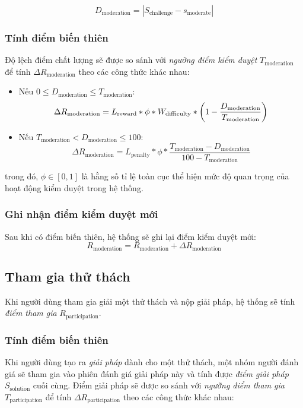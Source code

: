 \[D_{\text{moderation}}=|S_{\text{challenge}}-s_{\text{moderate}}|\]

\subsubsection{Tính điểm biến thiên}

Độ lệch điểm chất lượng sẽ được so sánh với \textit{ngưỡng điểm kiểm duyệt} $T_{\text{moderation}}$ để tính $\Delta R_{\text{moderation}}$ theo các công thức khác nhau:

\begin{itemize}
  \item Nếu $0 \leq D_{\text{moderation}} \leq  T_{\text{moderation}}$:
        \[\Delta R_{\text{\text{moderation}}} = L_{\text{reward}}*\phi * W_{\text{difficulty}} * \left(1 - \frac{D_{\text{moderation}}}{T_{\text{moderation}}}\right) \]
  \item Nếu $T_{\text{moderation}} < D_{\text{moderation}} \leq 100$:
        \[\Delta R_{{\text{moderation}}} = L_{\text{penalty}} * \phi * \frac{T_{\text{moderation}} - D_{\text{moderation}}}{100-T_{\text{moderation}}} \]
\end{itemize}
trong đó, $\phi \in [0, 1]$ là hằng số tỉ lệ toàn cục thể hiện mức độ quan trọng của hoạt động kiểm duyệt trong hệ thống.

\subsubsection{Ghi nhận điểm kiểm duyệt mới}

Sau khi có điểm biến thiên, hệ thống sẽ ghi lại điểm kiểm duyệt mới:
\[R_{\text{moderation}} = R_{\text{moderation}} + \Delta R_{\text{moderation}}\]

\subsection{Tham gia thử thách}

Khi người dùng tham gia giải một thử thách và nộp giải pháp, hệ thống sẽ tính \textit{điểm tham gia} $R_{\text{participation}}$.

\subsubsection{Tính điểm biến thiên}

Khi người dùng tạo ra \textit{giải pháp} dành cho một thử thách, một nhóm người đánh giá sẽ tham gia vào phiên đánh giá giải pháp này và tính được \textit{điểm giải pháp} $S_{\text{solution}}$ cuối cùng.
Điểm giải pháp sẽ được so sánh với \textit{ngưỡng điểm tham gia} $T_{\text{participation}}$ để tính $\Delta R_{\text{participation}}$ theo các công thức khác nhau:

